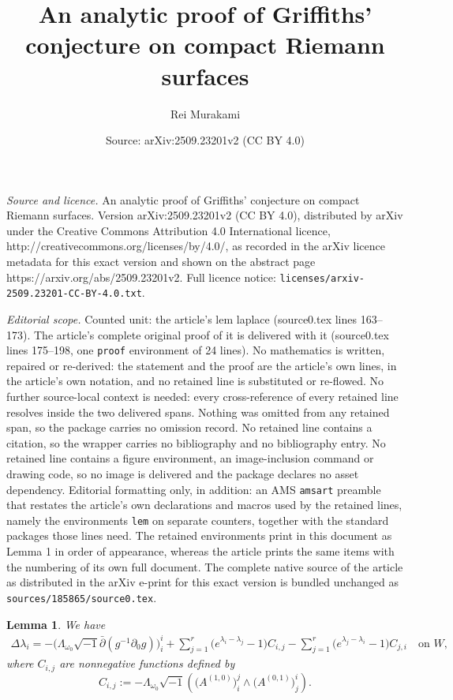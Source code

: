 \documentclass[10pt,a4paper]{amsart}
\title{An analytic proof of Griffiths' conjecture on compact Riemann surfaces}
\author{Rei Murakami}
\date{Source: arXiv:2509.23201v2 (CC BY 4.0)}
\newtheorem{lem}{Lemma}
\begin{document}
\maketitle

\noindent\emph{Source and licence.} An analytic proof of Griffiths' conjecture on compact Riemann surfaces. Version arXiv:2509.23201v2 (CC BY 4.0), distributed by arXiv under the Creative Commons Attribution 4.0 International licence, http://creativecommons.org/licenses/by/4.0/, as recorded in the arXiv licence metadata for this exact version and shown on the abstract page https://arxiv.org/abs/2509.23201v2. Full licence notice: \texttt{licenses/arxiv-2509.23201-CC-BY-4.0.txt}.\par\smallskip

\noindent\textit{Editorial scope.} Counted unit: the article's lem laplace (source0.tex lines 163--173). The article's complete original proof of it is delivered with it (source0.tex lines 175--198, one \texttt{proof} environment of 24 lines). No mathematics is written, repaired or re-derived: the statement and the proof are the article's own lines, in the article's own notation, and no retained line is substituted or re-flowed.  No further source-local context is needed: every cross-reference of every retained line resolves inside the two delivered spans.  Nothing was omitted from any retained span, so the package carries no omission record.  No retained line contains a citation, so the wrapper carries no bibliography and no bibliography entry.  No retained line contains a figure environment, an image-inclusion command or drawing code, so no image is delivered and the package declares no asset dependency.  Editorial formatting only, in addition: an AMS \texttt{amsart} preamble that restates the article's own declarations and macros used by the retained lines, namely the environments \texttt{lem} on separate counters, together with the standard packages those lines need.  The retained environments print in this document as Lemma 1 in order of appearance, whereas the article prints the same items with the numbering of its own full document.  The complete native source of the article as distributed in the arXiv e-print for this exact version is bundled unchanged as \texttt{sources/185865/source0.tex}.
\begin{lem}\label{lem: laplace}
    We have
    \begin{equation}\label{eq: laplace}
    \begin{aligned}
        \Delta\lambda_i=-\big(\Lambda_{\omega_0}\sqrt{-1}\bar{\partial}(g^{-1}\partial_0g)\big)^i_i+\sum_{j=1}^r\big(e^{\lambda_i-\lambda_j}-1\big)C_{i,j}
    -\sum_{j=1}^r\big(e^{\lambda_j-\lambda_i}-1\big)C_{j,i} \quad \text{on $W$},
    \end{aligned}
    \end{equation}
    where  $C_{i,j}$ are nonnegative functions defined by 
    $$C_{i,j}:=-\Lambda_{\omega_0}\sqrt{-1}\left(\big(A^{(1,0)}\big)^j_i \wedge\big(A^{(0,1)}\big)^i_j\right).$$
\end{lem}
\end{document}
